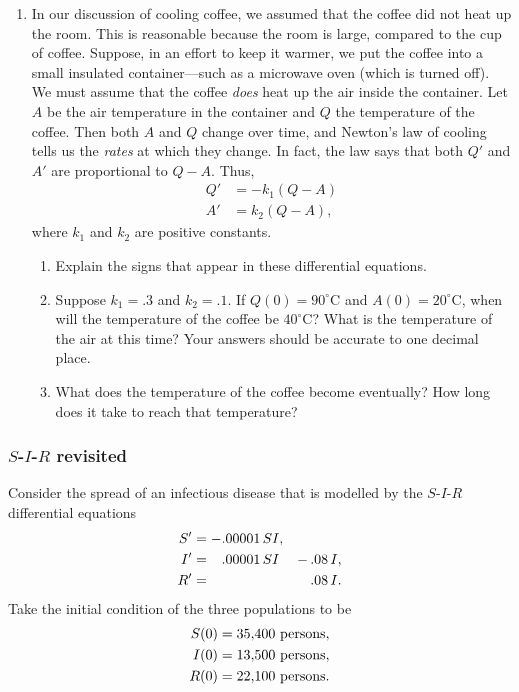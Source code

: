 \begin{enumerate}
\item In our discussion of cooling coffee, we assumed that the coffee did not heat up the room.  This is reasonable because the room is large, compared to the cup of coffee.  Suppose, in an effort to keep it warmer, we put the coffee into a small insulated container---such as a microwave oven (which is turned off).  We must assume that the coffee {\em does\/} heat up the air inside the container.  Let $A$ be the air temperature in the container and $Q$ the temperature of the coffee.  Then both $A$ and $Q$ change over time, and Newton's law of cooling tells us the {\em rates\/} at which they change.  In fact, the law says that both $Q'$ and $A'$ are proportional to $Q-A$.  Thus,
	\begin{align*}
	Q' &= -k_1(Q - A) \\
	A' &=  k_2(Q - A),
	\end{align*}
where $k_1$ and $k_2$ are positive constants.

  \begin{enumerate}
  \item Explain the signs that appear in these differential equations.

  \item Suppose  $k_1 = .3$ and $k_2 = .1$.  If $Q(0) = \mbox{$90^{\circ}$C}$  and  $A(0) = \mbox{$20^{\circ}$C}$, when will the temperature of the coffee be \mbox{$40^{\circ}$C}?  What is the temperature of the air at this time?  Your answers should be accurate to one decimal place.

  \item What does the temperature of the coffee become eventually?  How long does it take to reach that temperature?


\end{enumerate}
\end{enumerate}
\subsubsection{$S$-$I$-$R$ revisited}
\label{subsubsec:s-i-r-revisited}

Consider the spread of an infectious disease that is modelled by the
$S$-$I$-$R$ differential equations
\begin{alignat*}{2}
S'  & =   -.00001\,SI,  &      &    \\
I'  & = \hphantom{-}.00001\,SI  &   - \, &  .08\,I,  \\
R'  & =           		&      &  .08\,I.
\end{alignat*}
Take the initial condition of the three populations to be
	\begin{align*}
     S(0) &= 35,\!400 \ \hbox{persons}, \\
	I(0) &= 13,\!500 \ \hbox{persons}, \\
	R(0) &= 22,\!100 \ \hbox{persons}.
	\end{align*}


